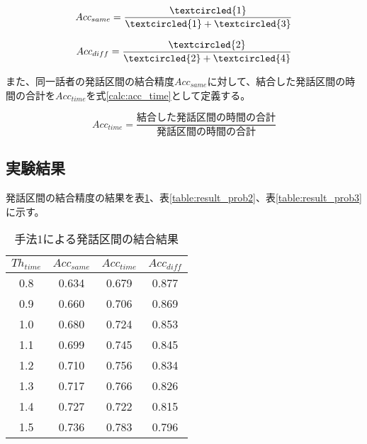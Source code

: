 \begin{equation}
\label{calc:calc_same_sp}
Acc_{same} = \frac{\textcircled{\scriptsize 1}}{\textcircled{\scriptsize 1} + \textcircled{\scriptsize 3}}
\end{equation}

\begin{equation}
\label{calc:calc_different_sp}
Acc_{diff} = \frac{\textcircled{\scriptsize 2}}{\textcircled{\scriptsize 2} + \textcircled{\scriptsize 4}}
\end{equation}

また、同一話者の発話区間の結合精度$Acc_{same}$に対して、結合した発話区間の時間の合計を$Acc_{time}$を式\ref{calc:acc_time}として定義する。

\begin{equation}
\label{calc:acc_time}
Acc_{time} = \frac{結合した発話区間の時間の合計}{発話区間の時間の合計}
\end{equation}

\subsection{実験結果}
発話区間の結合精度の結果を表\ref{table:result_prob1}、表\ref{table:result_prob2}、表\ref{table:result_prob3}に示す。

\begin{table}[H]
\begin{center}
\caption{手法1による発話区間の結合結果 \label{table:result_prob1}}
\begin{tabular}{|c||c|c|c|}
\hline
$Th_{time}$   & $Acc_{same}$ & $Acc_{time}$ & $Acc_{diff}$ \\ \hline
0.8 & 0.634    & 0.679    & 0.877    \\ \hline
0.9 & 0.660    & 0.706    & 0.869    \\ \hline
1.0 & 0.680    & 0.724    & 0.853    \\ \hline
1.1 & 0.699    & 0.745    & 0.845    \\ \hline
1.2 & 0.710    & 0.756    & 0.834    \\ \hline
1.3 & 0.717    & 0.766    & 0.826    \\ \hline
1.4 & 0.727    & 0.722    & 0.815    \\ \hline
1.5 & 0.736    & 0.783    & 0.796    \\ \hline
\end{tabular}
\end{center}
\end{table}

